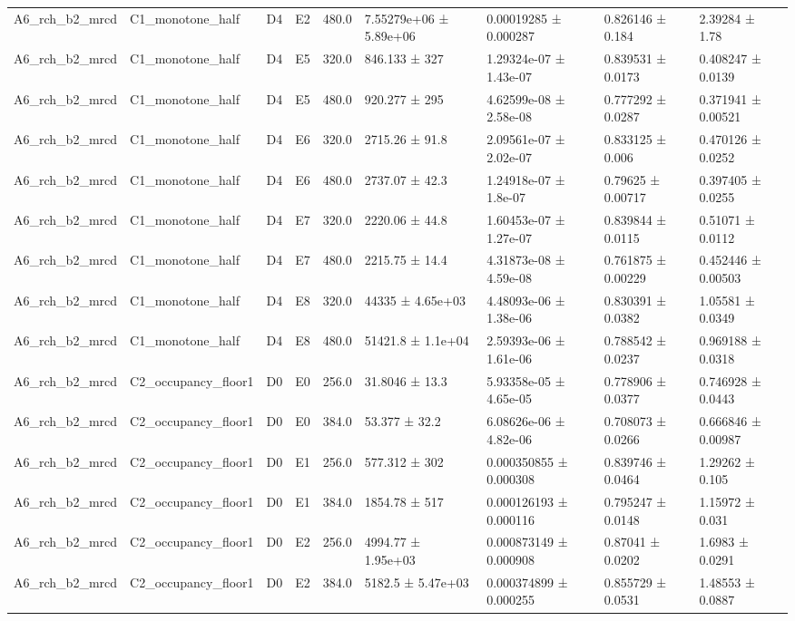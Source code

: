 \begin{table}
\begin{tabular}{lllllllll}
A6\_rch\_b2\_mrcd & C1\_monotone\_half & D4 & E2 & 480.0 & 7.55279e+06 ± 5.89e+06 & 0.00019285 ± 0.000287 & 0.826146 ± 0.184 & 2.39284 ± 1.78 \\
A6\_rch\_b2\_mrcd & C1\_monotone\_half & D4 & E5 & 320.0 & 846.133 ± 327 & 1.29324e-07 ± 1.43e-07 & 0.839531 ± 0.0173 & 0.408247 ± 0.0139 \\
A6\_rch\_b2\_mrcd & C1\_monotone\_half & D4 & E5 & 480.0 & 920.277 ± 295 & 4.62599e-08 ± 2.58e-08 & 0.777292 ± 0.0287 & 0.371941 ± 0.00521 \\
A6\_rch\_b2\_mrcd & C1\_monotone\_half & D4 & E6 & 320.0 & 2715.26 ± 91.8 & 2.09561e-07 ± 2.02e-07 & 0.833125 ± 0.006 & 0.470126 ± 0.0252 \\
A6\_rch\_b2\_mrcd & C1\_monotone\_half & D4 & E6 & 480.0 & 2737.07 ± 42.3 & 1.24918e-07 ± 1.8e-07 & 0.79625 ± 0.00717 & 0.397405 ± 0.0255 \\
A6\_rch\_b2\_mrcd & C1\_monotone\_half & D4 & E7 & 320.0 & 2220.06 ± 44.8 & 1.60453e-07 ± 1.27e-07 & 0.839844 ± 0.0115 & 0.51071 ± 0.0112 \\
A6\_rch\_b2\_mrcd & C1\_monotone\_half & D4 & E7 & 480.0 & 2215.75 ± 14.4 & 4.31873e-08 ± 4.59e-08 & 0.761875 ± 0.00229 & 0.452446 ± 0.00503 \\
A6\_rch\_b2\_mrcd & C1\_monotone\_half & D4 & E8 & 320.0 & 44335 ± 4.65e+03 & 4.48093e-06 ± 1.38e-06 & 0.830391 ± 0.0382 & 1.05581 ± 0.0349 \\
A6\_rch\_b2\_mrcd & C1\_monotone\_half & D4 & E8 & 480.0 & 51421.8 ± 1.1e+04 & 2.59393e-06 ± 1.61e-06 & 0.788542 ± 0.0237 & 0.969188 ± 0.0318 \\
A6\_rch\_b2\_mrcd & C2\_occupancy\_floor1 & D0 & E0 & 256.0 & 31.8046 ± 13.3 & 5.93358e-05 ± 4.65e-05 & 0.778906 ± 0.0377 & 0.746928 ± 0.0443 \\
A6\_rch\_b2\_mrcd & C2\_occupancy\_floor1 & D0 & E0 & 384.0 & 53.377 ± 32.2 & 6.08626e-06 ± 4.82e-06 & 0.708073 ± 0.0266 & 0.666846 ± 0.00987 \\
A6\_rch\_b2\_mrcd & C2\_occupancy\_floor1 & D0 & E1 & 256.0 & 577.312 ± 302 & 0.000350855 ± 0.000308 & 0.839746 ± 0.0464 & 1.29262 ± 0.105 \\
A6\_rch\_b2\_mrcd & C2\_occupancy\_floor1 & D0 & E1 & 384.0 & 1854.78 ± 517 & 0.000126193 ± 0.000116 & 0.795247 ± 0.0148 & 1.15972 ± 0.031 \\
A6\_rch\_b2\_mrcd & C2\_occupancy\_floor1 & D0 & E2 & 256.0 & 4994.77 ± 1.95e+03 & 0.000873149 ± 0.000908 & 0.87041 ± 0.0202 & 1.6983 ± 0.0291 \\
A6\_rch\_b2\_mrcd & C2\_occupancy\_floor1 & D0 & E2 & 384.0 & 5182.5 ± 5.47e+03 & 0.000374899 ± 0.000255 & 0.855729 ± 0.0531 & 1.48553 ± 0.0887 \\

\end{tabular}
\end{table}
